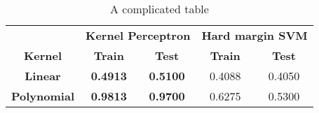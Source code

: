 \begin{table}[!htb]
    \caption{A complicated table}
    \centering
    \begin{tabular}{*{5}{c}}
    \toprule
    & \multicolumn{2}{c}{\textbf{Kernel Perceptron}} & \multicolumn{2}{c}{\textbf{Hard margin SVM}}\\
    \cmidrule(lr){2-3}\cmidrule(lr){4-5}
    \textbf{Kernel} &\textbf{Train} & \textbf{Test}      & \textbf{Train}& \textbf{Test}   \\
    \midrule
     \textbf{Linear}&\textbf{0.4913}&\textbf{0.5100}&0.4088&0.4050\\
     \textbf{Polynomial}&\textbf{0.9813}&\textbf{0.9700}&0.6275&0.5300\\
    \bottomrule
    \end{tabular}
    \label{tab:kp2}
\end{table}{}
